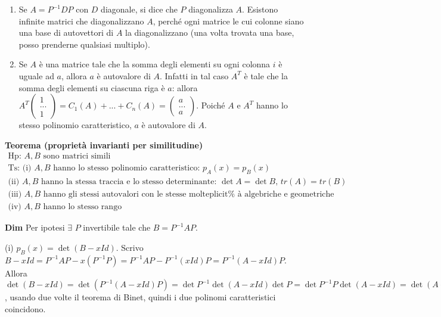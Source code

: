 \documentclass{article}
\begin{document}
\begin{enumerate}
\item Se $A=P^{-1}DP$ con $D$ diagonale, si dice che $P$ diagonalizza $A$.
Esistono infinite matrici che diagonalizzano $A$, perch\'{e} ogni matrice le
cui colonne siano una base di autovettori di $A$ la diagonalizzano (una
volta trovata una base, posso prenderne qualsiasi multiplo).

\item Se $A$ \`{e} una matrice tale che la somma degli elementi su ogni
colonna $i$ \`{e} uguale ad $a$, allora $a$ \`{e} autovalore di $A$. Infatti
in tal caso $A^{T}$ \`{e} tale che la somma degli elementi su ciascuna riga 
\`{e} $a$: allora $A^{T}\left( 
\begin{array}{c}
1 \\ 
... \\ 
1%
\end{array}%
\right) =C_{1}\left( A\right) +...+C_{n}\left( A\right) =\left( 
\begin{array}{c}
a \\ 
... \\ 
a%
\end{array}%
\right) $. Poich\'{e} $A$ e $A^{T}$ hanno lo stesso polinomio
caratteristico, $a$ \`{e} autovalore di $A$.
\end{enumerate}

\textbf{Teorema (propriet\`{a} invarianti per
similitudine)}%
\begin{gather*}
\text{Hp}\text{: }A,B\text{ sono matrici simili} \\
\text{Ts}\text{: (i) }A,B\text{ hanno lo stesso polinomio caratteristico: }%
p_{A}\left( x\right) =p_{B}\left( x\right) \\
\text{(ii) }A,B\text{ hanno la stessa traccia e lo stesso determinante: }%
\det A=\det B\text{, }tr\left( A\right) =tr\left( B\right) \\
\text{(iii) }A,B\text{ hanno gli stessi autovalori con le stesse molteplicit%
\`{a} algebriche e geometriche} \\
\text{(iv) }A,B\text{ hanno lo stesso rango}
\end{gather*}

\textbf{Dim} Per ipotesi $\exists $ $P$ invertibile tale che $B=P^{-1}AP$.

(i) $p_{B}\left( x\right) =\det \left( B-xId\right) $. Scrivo $%
B-xId=P^{-1}AP-x\left( P^{-1}P\right) =P^{-1}AP-P^{-1}\left( xId\right)
P=P^{-1}\left( A-xId\right) P$. Allora $\det \left( B-xId\right) =\det
\left( P^{-1}\left( A-xId\right) P\right) =\det P^{-1}\det \left(
A-xId\right) \det P=\det P^{-1}P\det \left( A-xId\right) =\det \left(
A-xId\right) =p_{A}\left( x\right) $, usando due volte il teorema di Binet,
quindi i due polinomi caratteristici coincidono.
\end{document}
